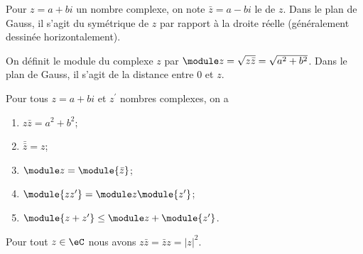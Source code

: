  Pour $z = a + bi$ un nombre complexe, on note $\bar z = a - bi$ le
  de $z$. Dans le plan de Gauss, il s'agit du
 symétrique de $z$ par rapport à la droite réelle (généralement
 dessinée horizontalement).

 On définit le module du complexe $z$ par $\module z = \sqrt{z\bar z} =
 \sqrt{a^2 + b^2}$. Dans le plan de Gauss, il s'agit de la distance
 entre $0$ et $z$.

\begin{proposition}
Pour tous $z = a+bi$ et $z^\prime$ nombres complexes, on a
   \begin{enumerate}
   \item $z \bar z = a^2 + b^2$;
   \item $\bar{\bar{z}} = z$;
   \item $\module z = \module {\bar z}$;
   \item $\module{zz^\prime} = \module z \module{z^\prime}$;
   \item $\module{z+z^\prime} \leq \module z + \module{z^\prime}$.
   \end{enumerate}
\end{proposition}

\begin{lemma}   \label{LEMooONLNooXLNbtB}
    Pour tout \( z\in \eC\) nous avons \( z\bar z=\bar z z=| z |^2\).
\end{lemma}

